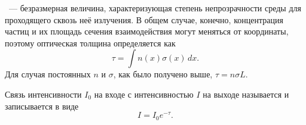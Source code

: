 ~--- безразмерная величина, характеризующая степень непрозрачности среды для проходящего сквозь неё излучения. В общем случае, конечно, концентрация частиц и их площадь сечения взаимодействия могут меняться от координаты, поэтому оптическая толщина определяется как
\begin{equation}
	\tau = \int n(x) \sigma(x)\,dx.
\end{equation}
Для случая постоянных $n$ и $\sigma$, как было получено выше, $\tau = n \sigma L$.

Связь интенсивности $I_0$ на входе с интенсивностью $I$ на выходе называется  и записывается в виде
\begin{equation}
	I = I_0 e^{-\tau}.
\end{equation}

